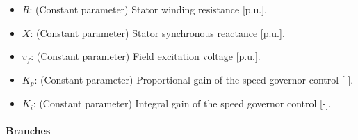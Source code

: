 \begin{itemize}
\begin{itemize}
  \item $R$: (Constant parameter) Stator winding resistance [p.u.].
  \item $X$: (Constant parameter) Stator synchronous reactance [p.u.].
  \item $v_f$: (Constant parameter) Field excitation voltage [p.u.].
  \item $K_p$: (Constant parameter) Proportional gain of the speed governor control [-].
  \item $K_i$: (Constant parameter) Integral gain of the speed governor control [-].
\end{itemize}
\end{itemize}

\paragraph{Branches}

